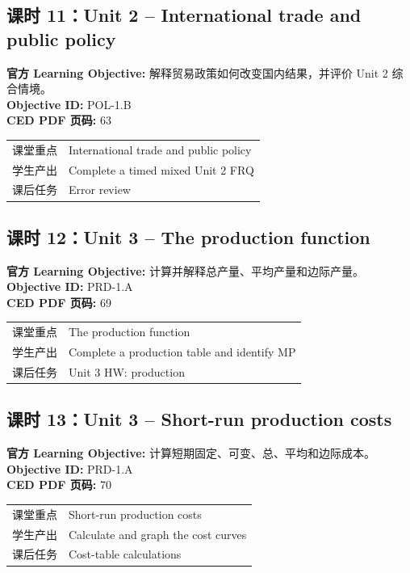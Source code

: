 \documentclass[11pt,a4paper]{ctexart}
\newcommand{\objectivebox}[1]{\noindent\colorbox{aplight}{\parbox{0.96\textwidth}{#1}}}
\begin{document}
\subsection{课时 11：Unit 2 -- International trade and public policy}
\objectivebox{\textbf{官方 Learning Objective:} 解释贸易政策如何改变国内结果，并评价 Unit 2 综合情境。\\\textbf{Objective ID:} POL-1.B\\\textbf{CED PDF 页码:} 63}\par\vspace{0.4em}
\begin{tabularx}{\textwidth}{p{3.0cm}Y}
\toprule
课堂重点 & International trade and public policy\\
学生产出 & Complete a timed mixed Unit 2 FRQ\\
课后任务 & Error review\\
\bottomrule
\end{tabularx}
\subsection{课时 12：Unit 3 -- The production function}
\objectivebox{\textbf{官方 Learning Objective:} 计算并解释总产量、平均产量和边际产量。\\\textbf{Objective ID:} PRD-1.A\\\textbf{CED PDF 页码:} 69}\par\vspace{0.4em}
\begin{tabularx}{\textwidth}{p{3.0cm}Y}
\toprule
课堂重点 & The production function\\
学生产出 & Complete a production table and identify MP\\
课后任务 & Unit 3 HW: production\\
\bottomrule
\end{tabularx}
\newpage
\subsection{课时 13：Unit 3 -- Short-run production costs}
\objectivebox{\textbf{官方 Learning Objective:} 计算短期固定、可变、总、平均和边际成本。\\\textbf{Objective ID:} PRD-1.A\\\textbf{CED PDF 页码:} 70}\par\vspace{0.4em}
\begin{tabularx}{\textwidth}{p{3.0cm}Y}
\toprule
课堂重点 & Short-run production costs\\
学生产出 & Calculate and graph the cost curves\\
课后任务 & Cost-table calculations\\
\bottomrule
\end{tabularx}
\end{document}
